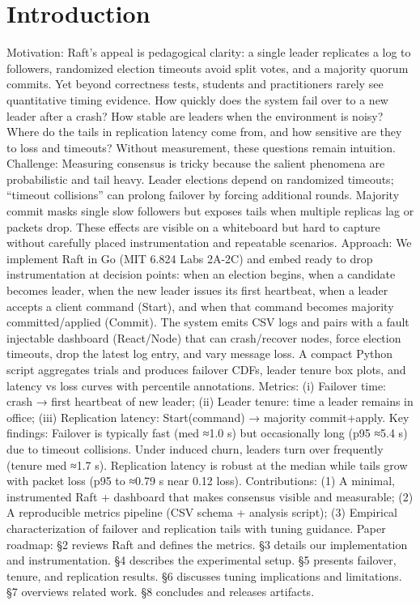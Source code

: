\documentclass[11pt]{article}
\begin{document}
\section{Introduction}
Motivation: Raft's appeal is pedagogical clarity: a single leader replicates a log to followers, randomized election timeouts avoid split votes, and a majority quorum commits. Yet beyond correctness tests, students and practitioners rarely see quantitative timing evidence. How quickly does the system fail over to a new leader after a crash? How stable are leaders when the environment is noisy? Where do the tails in replication latency come from, and how sensitive are they to loss and timeouts? Without measurement, these questions remain intuition.
Challenge: Measuring consensus is tricky because the salient phenomena are probabilistic and tail heavy. Leader elections depend on randomized timeouts; “timeout collisions” can prolong failover by forcing additional rounds. Majority commit masks single slow followers but exposes tails when multiple replicas lag or packets drop. These effects are visible on a whiteboard but hard to capture without carefully placed instrumentation and repeatable scenarios.
Approach: We implement Raft in Go (MIT 6.824 Labs 2A-2C) and embed ready to drop instrumentation at decision points: when an election begins, when a candidate becomes leader, when the new leader issues its first heartbeat, when a leader accepts a client command (Start), and when that command becomes majority committed/applied (Commit). The system emits CSV logs and pairs with a fault injectable dashboard (React/Node) that can crash/recover nodes, force election timeouts, drop the latest log entry, and vary message loss. A compact Python script aggregates trials and produces failover CDFs, leader tenure box plots, and latency vs loss curves with percentile annotations.
Metrics: (i) Failover time: crash → first heartbeat of new leader; (ii) Leader tenure: time a leader remains in office; (iii) Replication latency: Start(command) → majority commit+apply.
Key findings: Failover is typically fast (med ≈1.0 s) but occasionally long (p95 ≈5.4 s) due to timeout collisions. Under induced churn, leaders turn over frequently (tenure med ≈1.7 s). Replication latency is robust at the median while tails grow with packet loss (p95 to ≈0.79 s near 0.12 loss).
Contributions: (1) A minimal, instrumented Raft + dashboard that makes consensus visible and measurable; (2) A reproducible metrics pipeline (CSV schema + analysis script); (3) Empirical characterization of failover and replication tails with tuning guidance.
Paper roadmap: §2 reviews Raft and defines the metrics. §3 details our implementation and instrumentation. §4 describes the experimental setup. §5 presents failover, tenure, and replication results. §6 discusses tuning implications and limitations. §7 overviews related work. §8 concludes and releases artifacts.
\end{document}
